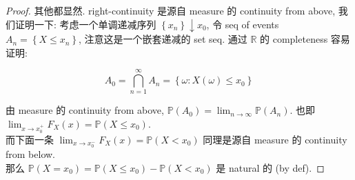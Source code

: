 \begin{proof}

其他都显然. right-continuity 是源自 measure 的 continuity from above, 我们证明一下: 考虑一个单调递减序列 \(\left\{ \mathit{x}_{\mathit{n}} \right\} \downarrow \mathit{x}_{0}\), 令 seq of events \(\mathit{A}_{\mathit{n}} = \left\{ {\mathit{X} \leq \mathit{x}_{\mathit{n}}} \right\}\), 注意这是一个嵌套递减的 set seq. 通过 \(\mathbb{R}\) 的 completeness 容易证明:

\[\mathit{A}_{0} = \bigcap\limits_{\mathit{n} = 1}^{\infty}\mathit{A}_{\mathit{n}} = \left\{ {\mathit{\omega}:\mathit{X}(\mathit{\omega}) \leq \mathit{x}_{0}} \right\}\]

由 measure 的 continuity from above, \(\mathbb{P}(\mathit{A}_{0}) = \lim_{\mathit{n}\rightarrow\infty}\mathbb{P}(\mathit{A}_{\mathit{n}})\). 也即 \(\lim_{\mathit{x}\rightarrow\mathit{x}_{0}^{+}}\mathit{F}_{\mathit{X}}(\mathit{x}) = \mathbb{P}(\mathit{X} \leq \mathit{x}_{0})\).\\
而下面一条 \(\lim_{\mathit{x}\rightarrow\mathit{x}_{0}^{-}}\mathit{F}_{\mathit{X}}(\mathit{x}) = \mathbb{P}(\mathit{X} < \mathit{x}_{0})\) 同理是源自 measure 的 continuity from below.\\
那么 \(\mathbb{P}(\mathit{X} = \mathit{x}_{0}) = \mathbb{P}(\mathit{X} \leq \mathit{x}_{0}) - \mathbb{P}(\mathit{X} < \mathit{x}_{0})\) 是 natural 的 (by def).

\end{proof}

